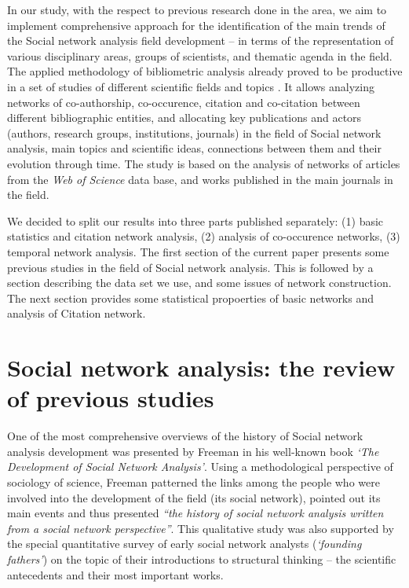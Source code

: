 \documentclass[11pt]{article} %
\begin{document}
In our study, with the respect to previous research done in the area, we aim to implement comprehensive approach for the identification of the main  trends of the Social network analysis field development -- in terms of the representation of various disciplinary areas, groups of scientists, and thematic agenda in the field. The applied methodology of bibliometric analysis already proved to be productive in a set of studies of different scientific fields and topics \citep{kejzar,Understand,PeerRew}. It allows analyzing networks of co-authorship, co-occurence, citation and co-citation between different bibliographic entities, and allocating key publications and actors (authors, research groups, institutions, journals) in the field of Social network analysis, main topics and scientific ideas, connections between them and their evolution through time. The study is based on the analysis of networks of articles from the \textit{Web of Science} data base, and works published in the main journals in the field. \medskip 

We decided to split our results into three parts published separately: (1) basic statistics and citation network analysis, (2) analysis of co-occurence networks, (3) temporal network analysis. The first section of the current paper presents some previous studies in the field of Social network analysis. This is followed by a section describing the data set we use, and some issues of network construction. The next section provides some statistical propoerties of basic networks and analysis of Citation network.

\section{Social network analysis: the review of previous studies}

One of the most comprehensive overviews of the history of Social network analysis development was presented by Freeman in his well-known book \textit{`The Development of Social Network Analysis'}\citep{SNAdev}. Using a methodological perspective of sociology of science, Freeman patterned the links  among the people who were involved into the development of the field (its social network),  pointed out its main events and thus presented \textit{“the history of social network analysis written from a social network perspective”}. This qualitative study was also supported by the special quantitative survey of early social network analysts (\textit{`founding fathers'}) on the topic of their introductions to structural thinking -- the scientific antecedents and their most important works. \medskip 
\end{document}
